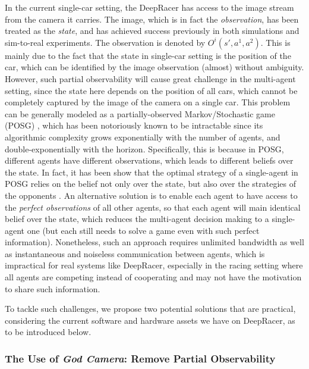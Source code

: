 In the current single-car setting, the DeepRacer has access to the image stream from the camera it carries. The image, which is in fact the \emph{observation}, has been treated as the \emph{state}, and has achieved success previously in both simulations and sim-to-real experiments. The observation is denoted by $O^i(s',a^1,a^2)$.
This is mainly due to the fact that the state in single-car setting is the position of the car, which can be identified by the image observation (almost) without ambiguity. 
However, such partial observability will cause great challenge in the multi-agent setting, since the state here depends on the position of all cars, which cannot be completely captured by the image of the  camera on a single car. This problem can be generally modeled as a partially-observed Markov/Stochastic game (POSG) \citep{hansen2004dynamic}, which has been notoriously known to be intractable since its algorithmic complexity grows exponentially with the number of agents, and double-exponentially with the horizon. Specifically, this is because in POSG, different agents have different observations, which leads to different beliefs over the state. In fact, it has been show that the optimal strategy of a single-agent in POSG relies on the belief not only over the state, but also over the strategies of the opponents \citep{hansen2004dynamic}.  An alternative  solution is to enable each agent to have access to the \emph{perfect observations} of all other agents, so that each agent will main identical belief over the state, which reduces the multi-agent decision making to a single-agent one (but each still needs to solve a game even with such perfect information). Nonetheless, such an approach requires  unlimited bandwidth as well as  instantaneous and noiseless 
communication between agents, which is impractical for real systems like DeepRacer, especially in the racing setting where all agents are competing instead of cooperating and may not have the motivation to share such information. 

To tackle   such challenges, we propose two potential solutions that are practical, considering the current software and hardware assets we have on DeepRacer, as to be introduced below. 


\subsubsection{The Use of \emph{God Camera}: Remove Partial Observability}

